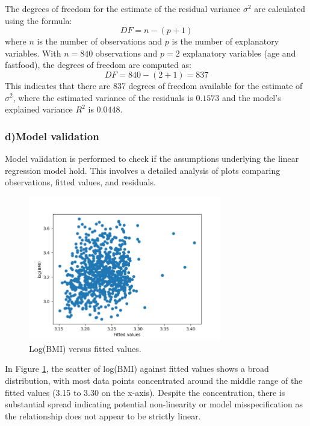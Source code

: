 \documentclass{rapport}
\begin{document}
\noindent
The degrees of freedom for the estimate of the residual variance \( \sigma^2 \) are calculated using the formula:
\[
DF = n - (p + 1)
\]
where \( n \) is the number of observations and \( p \) is the number of explanatory variables. With \( n = 840 \) observations and \( p = 2 \) explanatory variables (age and fastfood), the degrees of freedom are computed as:
\[
DF = 840 - (2 + 1) = 837
\]
This indicates that there are 837 degrees of freedom available for the estimate of \( \sigma^2 \), where the estimated variance of the residuals is \( 0.1573 \) and the model's explained variance \( R^2 \) is \( 0.0448 \).



\subsubsection*{\textbf{d)}Model validation}

\noindent
Model validation is performed to check if the assumptions underlying the linear regression model hold. This involves a detailed analysis of plots comparing observations, fitted values, and residuals. 

\begin{figure}[H]
    \centering
    \includegraphics[width=0.75\textwidth]{fitted_values_vs_log_bmi.png}
    \caption{\small Log(BMI) versus fitted values.}
    \label{fig:fitted_values}
\end{figure}

\noindent
In Figure \ref{fig:fitted_values}, the scatter of log(BMI) against fitted values shows a broad distribution, with most data points concentrated around the middle range of the fitted values (3.15 to 3.30 on the x-axis). Despite the concentration, there is substantial spread indicating potential non-linearity or model misspecification as the relationship does not appear to be strictly linear.
\end{document}
